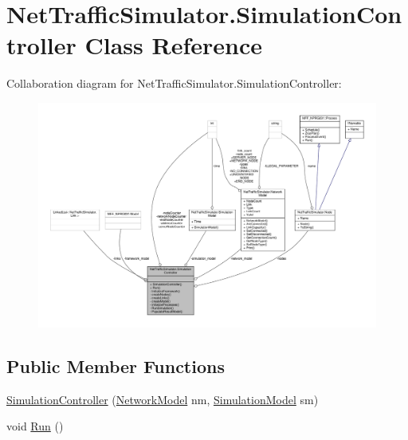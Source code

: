 \hypertarget{classNetTrafficSimulator_1_1SimulationController}{\section{Net\-Traffic\-Simulator.\-Simulation\-Controller Class Reference}
\label{classNetTrafficSimulator_1_1SimulationController}
}


Collaboration diagram for Net\-Traffic\-Simulator.\-Simulation\-Controller\-:
\nopagebreak
\begin{figure}[H]
\begin{center}
\leavevmode
\includegraphics[width=350pt]{classNetTrafficSimulator_1_1SimulationController__coll__graph}
\end{center}
\end{figure}
\subsection*{Public Member Functions}
\begin{DoxyCompactItemize}
\item 
\hyperlink{classNetTrafficSimulator_1_1SimulationController_a30890df3e3b1ce4cef47fe597afa58f2}{Simulation\-Controller} (\hyperlink{classNetTrafficSimulator_1_1NetworkModel}{Network\-Model} nm, \hyperlink{classNetTrafficSimulator_1_1SimulationModel}{Simulation\-Model} sm)
\item 
void \hyperlink{classNetTrafficSimulator_1_1SimulationController_a22dedb5c0d0233bfa7acfc858af4a0cf}{Run} ()
\end{DoxyCompactItemize}
